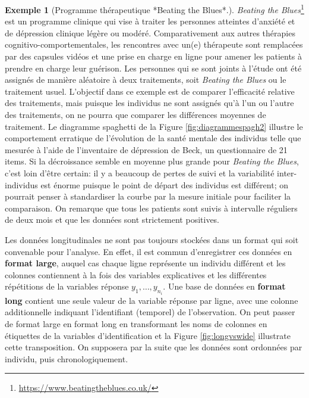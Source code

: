 \documentclass[
  11pt,
  letterpaper,
]{article}
\renewcommand{\href}[2]{#2\footnote{\url{#1}}}
\theoremstyle{definition}
\theoremstyle{definition}
\newtheorem{example}{Exemple}[section]
\theoremstyle{definition}
\theoremstyle{definition}
\theoremstyle{remark}
\begin{document}
\begin{example}[Programme thérapeutique *Beating the Blues*.]
\protect\hypertarget{exm:beatingtheblues}{}\label{exm:beatingtheblues}\href{https://www.beatingtheblues.co.uk/}{\emph{Beating the Blues}} est un programme clinique qui vise à traiter les personnes atteintes d'anxiété et de dépression clinique légère ou modéré. Comparativement aux autres thérapies cognitivo-comportementales, les rencontres avec un(e) thérapeute sont remplacées par des capsules vidéos et une prise en charge en ligne pour amener les patients à prendre en charge leur guérison. Les personnes qui se sont joints à l'étude ont été assignés de manière aléatoire à deux traitements, soit \emph{Beating the Blues} ou le traitement usuel. L'objectif dans ce exemple est de comparer l'efficacité relative des traitements, mais puisque les individus ne sont assignés qu'à l'un ou l'autre des traitements, on ne pourra que comparer les différences moyennes de traitement. Le diagramme spaghetti de la Figure \ref{fig:diagrammespagh2} illustre le comportement erratique de l'évolution de la santé mentale des individus telle que mesurée à l'aide de l'inventaire de dépression de Beck, un questionnaire de 21 items. Si la décroissance semble en moyenne plus grande pour \emph{Beating the Blues}, c'est loin d'être certain: il y a beaucoup de pertes de suivi et la variabilité inter-individus est énorme puisque le point de départ des individus est différent; on pourrait penser à standardiser la courbe par la mesure initiale pour faciliter la comparaison. On remarque que tous les patients sont suivis à intervalle réguliers de deux mois et que les données sont strictement positives.
\end{example}

Les données longitudinales ne sont pas toujours stockées dans un format qui soit convenable pour l'analyse. En effet, il est commun d'enregistrer ces données en \textbf{format large}, auquel cas chaque ligne représente un individu différent et les colonnes contiennent à la fois des variables explicatives et les différentes répétitions de la variables réponse \(y_1, \ldots, y_{n_i}\).
Une base de données en \textbf{format long} contient une seule valeur de la variable réponse par ligne, avec une colonne additionnelle indiquant l'identifiant (temporel) de l'observation. On peut passer de format large en format long en transformant les noms de colonnes en étiquettes de la variables d'identification et la Figure \ref{fig:longvswide} illustrate cette transposition. On supposera par la suite que les données sont ordonnées par individu, puis chronologiquement.
\end{document}
